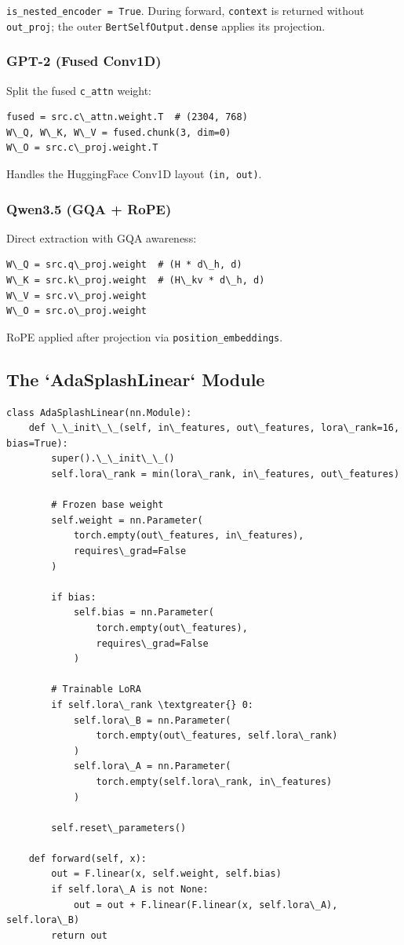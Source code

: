 \texttt{is\_nested\_encoder = True}. During forward, \texttt{context} is returned without 
\texttt{out\_proj}; the outer \texttt{BertSelfOutput.dense} applies its projection.

\subsubsection{GPT-2 (Fused Conv1D)}

Split the fused \texttt{c\_attn} weight:

\begin{lstlisting}
fused = src.c\_attn.weight.T  # (2304, 768)
W\_Q, W\_K, W\_V = fused.chunk(3, dim=0)
W\_O = src.c\_proj.weight.T
\end{lstlisting}

Handles the HuggingFace Conv1D layout \texttt{(in, out)}.

\subsubsection{Qwen3.5 (GQA + RoPE)}

Direct extraction with GQA awareness:

\begin{lstlisting}
W\_Q = src.q\_proj.weight  # (H * d\_h, d)
W\_K = src.k\_proj.weight  # (H\_kv * d\_h, d)
W\_V = src.v\_proj.weight
W\_O = src.o\_proj.weight
\end{lstlisting}

RoPE applied after projection via \texttt{position\_embeddings}.

\subsection{The `AdaSplashLinear` Module}

\begin{lstlisting}
class AdaSplashLinear(nn.Module):
    def \_\_init\_\_(self, in\_features, out\_features, lora\_rank=16, bias=True):
        super().\_\_init\_\_()
        self.lora\_rank = min(lora\_rank, in\_features, out\_features)
        
        # Frozen base weight
        self.weight = nn.Parameter(
            torch.empty(out\_features, in\_features),
            requires\_grad=False
        )
        
        if bias:
            self.bias = nn.Parameter(
                torch.empty(out\_features),
                requires\_grad=False
            )
        
        # Trainable LoRA
        if self.lora\_rank \textgreater{} 0:
            self.lora\_B = nn.Parameter(
                torch.empty(out\_features, self.lora\_rank)
            )
            self.lora\_A = nn.Parameter(
                torch.empty(self.lora\_rank, in\_features)
            )
        
        self.reset\_parameters()
    
    def forward(self, x):
        out = F.linear(x, self.weight, self.bias)
        if self.lora\_A is not None:
            out = out + F.linear(F.linear(x, self.lora\_A), self.lora\_B)
        return out
\end{lstlisting}

